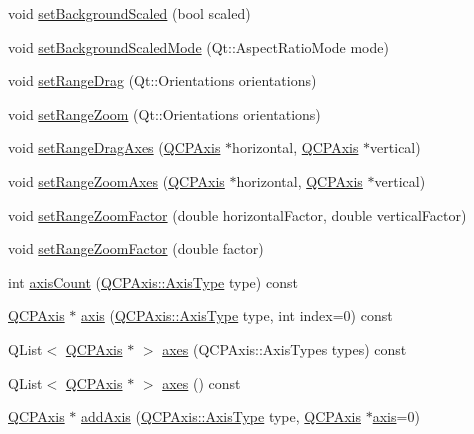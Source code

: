 \begin{DoxyCompactItemize}
\item 
void \hyperlink{classQCPAxisRect_ae6d36c3e0e968ffb991170a018e7b503}{set\+Background\+Scaled} (bool scaled)
\item 
void \hyperlink{classQCPAxisRect_a5ef77ea829c9de7ba248e473f48f7305}{set\+Background\+Scaled\+Mode} (Qt\+::\+Aspect\+Ratio\+Mode mode)
\item 
void \hyperlink{classQCPAxisRect_ae6aef2f7211ba6097c925dcd26008418}{set\+Range\+Drag} (Qt\+::\+Orientations orientations)
\item 
void \hyperlink{classQCPAxisRect_a7960a9d222f1c31d558b064b60f86a31}{set\+Range\+Zoom} (Qt\+::\+Orientations orientations)
\item 
void \hyperlink{classQCPAxisRect_a648cce336bd99daac4a5ca3e5743775d}{set\+Range\+Drag\+Axes} (\hyperlink{classQCPAxis}{Q\+C\+P\+Axis} $\ast$horizontal, \hyperlink{classQCPAxis}{Q\+C\+P\+Axis} $\ast$vertical)
\item 
void \hyperlink{classQCPAxisRect_a9442cca2aa358405f39a64d51eca13d2}{set\+Range\+Zoom\+Axes} (\hyperlink{classQCPAxis}{Q\+C\+P\+Axis} $\ast$horizontal, \hyperlink{classQCPAxis}{Q\+C\+P\+Axis} $\ast$vertical)
\item 
void \hyperlink{classQCPAxisRect_a895d7ac745ea614e04056244b3c138ac}{set\+Range\+Zoom\+Factor} (double horizontal\+Factor, double vertical\+Factor)
\item 
void \hyperlink{classQCPAxisRect_ae83d187b03fc6fa4f00765ad50cd3fc3}{set\+Range\+Zoom\+Factor} (double factor)
\item 
int \hyperlink{classQCPAxisRect_a16e3e4646e52e4b5d5b865076c29ae58}{axis\+Count} (\hyperlink{classQCPAxis_ae2bcc1728b382f10f064612b368bc18a}{Q\+C\+P\+Axis\+::\+Axis\+Type} type) const 
\item 
\hyperlink{classQCPAxis}{Q\+C\+P\+Axis} $\ast$ \hyperlink{classQCPAxisRect_a560de44e47a4af0f86c59102a094b1e4}{axis} (\hyperlink{classQCPAxis_ae2bcc1728b382f10f064612b368bc18a}{Q\+C\+P\+Axis\+::\+Axis\+Type} type, int index=0) const 
\item 
Q\+List$<$ \hyperlink{classQCPAxis}{Q\+C\+P\+Axis} $\ast$ $>$ \hyperlink{classQCPAxisRect_a66654d51ca611ef036ded36250cd2518}{axes} (Q\+C\+P\+Axis\+::\+Axis\+Types types) const 
\item 
Q\+List$<$ \hyperlink{classQCPAxis}{Q\+C\+P\+Axis} $\ast$ $>$ \hyperlink{classQCPAxisRect_a18dcdc0dd6c7520bc9f3d15a7a3feec2}{axes} () const 
\item 
\hyperlink{classQCPAxis}{Q\+C\+P\+Axis} $\ast$ \hyperlink{classQCPAxisRect_a2dc336092ccc57d44a46194c8a23e4f4}{add\+Axis} (\hyperlink{classQCPAxis_ae2bcc1728b382f10f064612b368bc18a}{Q\+C\+P\+Axis\+::\+Axis\+Type} type, \hyperlink{classQCPAxis}{Q\+C\+P\+Axis} $\ast$\hyperlink{classQCPAxisRect_a560de44e47a4af0f86c59102a094b1e4}{axis}=0)

\end{DoxyCompactItemize}
